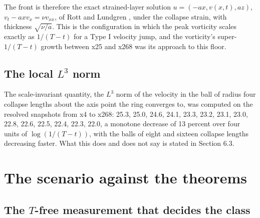 \documentclass[11pt]{article}
\begin{document}
The front is therefore the exact strained-layer solution $u = (-a x, v(x, t), a z)$, $v_t - a x v_x = \nu v_{xx}$, of Rott and Lundgren \cite{R58,L82}, under the collapse strain, with thickness $\sqrt{\nu / a}$. This is the configuration in which the peak vorticity scales exactly as $1/(T - t)$ for a Type I velocity jump, and the vorticity's super-$1/(T - t)$ growth between x25 and x268 was its approach to this floor.

\subsection{The local $L^3$ norm}

The scale-invariant quantity, the $L^3$ norm of the velocity in the ball of radius four collapse lengths about the axis point the ring converges to, was computed on the resolved snapshots from x4 to x268: 25.3, 25.0, 24.6, 24.1, 23.3, 23.2, 23.1, 23.0, 22.8, 22.6, 22.5, 22.4, 22.3, 22.0, a monotone decrease of 13 percent over four units of $\log(1/(T - t))$, with the balls of eight and sixteen collapse lengths decreasing faster. What this does and does not say is stated in Section 6.3.

\section{The scenario against the theorems}
\setcounter{subsection}{-1}

\subsection{The $T$-free measurement that decides the class}
\end{document}
